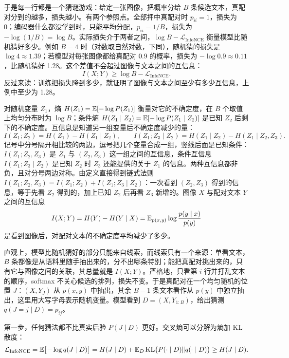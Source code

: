 于是每一行都是一个猜谜游戏：给定一张图像，把概率分给 \(B\) 条候选文本，真配对分到的越多，损失越小。有两个参照点。全部押中真配对时 \(p_{ii}=1\)，损失为 0；编码器什么都没学到时，只能平均分配，\(p_{ii}=1/B\)，损失为 \(-\log(1/B)=\log B\)。实际损失介于两者之间，\(\log B-\mathcal L_{\mathrm{InfoNCE}}\) 衡量模型比随机猜好多少。例如 \(B=4\) 时（对数取自然对数，下同），随机猜的损失是 \(\log4\approx1.39\)；若模型对每张图像都给真配对 0.9 的概率，损失为 \(-\log0.9\approx0.11\)，比随机猜好 1.28。这个差值不会超过图像与文本之间的互信息：
\begin{equation}
 I(X;Y)\ge\log B-\mathcal L_{\mathrm{InfoNCE}}.
 \label{eq:infonce-bound}
\end{equation}
反过来读：训练把损失降到多少，就证明了图像与文本之间至少有多少互信息，上例中至少为 1.28。

对随机变量 \(Z_1\)，熵 \(H(Z_1)=\mathbb{E}[-\log P(Z_1)]\) 衡量对它的不确定度，在 \(B\) 个取值上均匀分布时为 \(\log B\)；条件熵 \(H(Z_1\mid Z_2)=\mathbb{E}[-\log P(Z_1\mid Z_2)]\) 是已知 \(Z_2\) 后剩下的不确定度。互信息是知道另一组变量后不确定度减少的量：
\begin{equation}
 I(Z_1;Z_2)=H(Z_1)-H(Z_1\mid Z_2),\qquad
 I(Z_1;Z_3\mid Z_2)=H(Z_1\mid Z_2)-H(Z_1\mid Z_2,Z_3).
\end{equation}
记号中分号隔开相比较的两边，逗号把几个变量合成一组，竖线后面是已知条件：\(I(Z_1;Z_2,Z_3)\) 是 \(Z_1\) 与 \((Z_2,Z_3)\) 这一组之间的互信息，条件互信息 \(I(Z_1;Z_3\mid Z_2)\) 是已知 \(Z_2\) 时 \(Z_3\) 还能提供的关于 \(Z_1\) 的信息。两种互信息都非负，且对分号两边对称。由定义直接得到链式法则 \(I(Z_1;Z_2,Z_3)=I(Z_1;Z_2)+I(Z_1;Z_3\mid Z_2)\)：一次看到 \((Z_2,Z_3)\) 得到的信息，等于先看 \(Z_2\) 得到的，加上已知 \(Z_2\) 后再看 \(Z_3\) 新增的。图像 \(X\) 与配对文本 \(Y\) 之间的互信息
\begin{equation}
 I(X;Y)=H(Y)-H(Y\mid X)=\mathbb{E}_{p(x,y)}\log\frac{p(y\mid x)}{p(y)}
\end{equation}
是看到图像后，对配对文本的不确定度平均减少了多少。

直观上，模型比随机猜好的部分只能来自线索，而线索只有一个来源：单看文本，\(B\) 条都像是从语料里随手抽出来的，分不出哪条特别；能把真配对挑出来的，只有它与图像之间的关联，其总量就是 \(I(X;Y)\)。严格地，只看第 \(i\) 行并打乱文本的顺序，softmax 不关心候选的排列，损失不变。于是真配对在一个均匀随机的位置 \(J\)：\((X,Y_J)\) 从 \(p(x,y)\) 中抽出，其余 \(B-1\) 条文本看作从 \(p(y)\) 中独立抽出，这里用大写字母表示随机变量。模型看到 \(D=(X,Y_{1:B})\)，给出猜测 \(q(J=j\mid D)=p_{ij}\)。

第一步，任何猜法都不比真实后验 \(P(J\mid D)\) 更好。交叉熵可以分解为熵加 KL 散度：
\begin{equation}
 \mathcal L_{\mathrm{InfoNCE}}=\mathbb{E}\bigl[-\log q(J\mid D)\bigr]
 =H(J\mid D)+\mathbb{E}_D\,\mathrm{KL}\bigl(P(\cdot\mid D)\Vert q(\cdot\mid D)\bigr)
 \ge H(J\mid D).
\end{equation}


